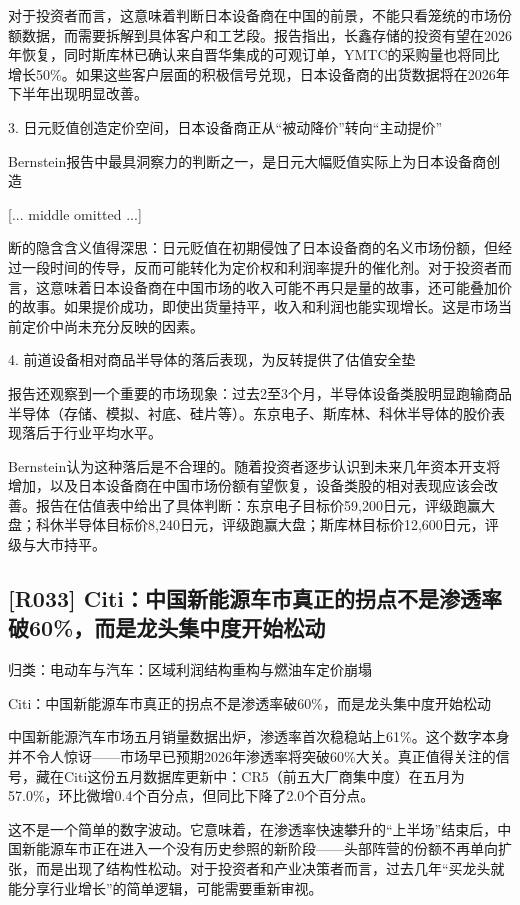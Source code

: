 \documentclass[11pt]{ctexart}
\begin{document}
对于投资者而言，这意味着判断日本设备商在中国的前景，不能只看笼统的市场份额数据，而需要拆解到具体客户和工艺段。报告指出，长鑫存储的投资有望在2026年恢复，同时斯库林已确认来自晋华集成的可观订单，YMTC的采购量也将同比增长50\%。如果这些客户层面的积极信号兑现，日本设备商的出货数据将在2026年下半年出现明显改善。

3. 日元贬值创造定价空间，日本设备商正从“被动降价”转向“主动提价”

Bernstein报告中最具洞察力的判断之一，是日元大幅贬值实际上为日本设备商创造

[... middle omitted ...]

断的隐含含义值得深思：日元贬值在初期侵蚀了日本设备商的名义市场份额，但经过一段时间的传导，反而可能转化为定价权和利润率提升的催化剂。对于投资者而言，这意味着日本设备商在中国市场的收入可能不再只是量的故事，还可能叠加价的故事。如果提价成功，即使出货量持平，收入和利润也能实现增长。这是市场当前定价中尚未充分反映的因素。

4. 前道设备相对商品半导体的落后表现，为反转提供了估值安全垫

报告还观察到一个重要的市场现象：过去2至3个月，半导体设备类股明显跑输商品半导体（存储、模拟、衬底、硅片等）。东京电子、斯库林、科休半导体的股价表现落后于行业平均水平。

Bernstein认为这种落后是不合理的。随着投资者逐步认识到未来几年资本开支将增加，以及日本设备商在中国市场份额有望恢复，设备类股的相对表现应该会改善。报告在估值表中给出了具体判断：东京电子目标价59,200日元，评级跑赢大盘；科休半导体目标价8,240日元，评级跑赢大盘；斯库林目标价12,600日元，评级与大市持平。

\subsection{[R033] Citi：中国新能源车市真正的拐点不是渗透率破60\%，而是龙头集中度开始松动}
{\small\color{refgray}归类：电动车与汽车：区域利润结构重构与燃油车定价崩塌}

Citi：中国新能源车市真正的拐点不是渗透率破60\%，而是龙头集中度开始松动

中国新能源汽车市场五月销量数据出炉，渗透率首次稳稳站上61\%。这个数字本身并不令人惊讶——市场早已预期2026年渗透率将突破60\%大关。真正值得关注的信号，藏在Citi这份五月数据库更新中：CR5（前五大厂商集中度）在五月为57.0\%，环比微增0.4个百分点，但同比下降了2.0个百分点。

这不是一个简单的数字波动。它意味着，在渗透率快速攀升的“上半场”结束后，中国新能源车市正在进入一个没有历史参照的新阶段——头部阵营的份额不再单向扩张，而是出现了结构性松动。对于投资者和产业决策者而言，过去几年“买龙头就能分享行业增长”的简单逻辑，可能需要重新审视。
\end{document}
